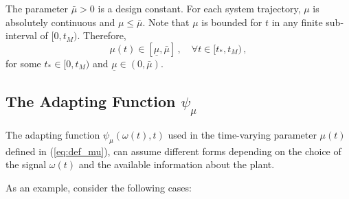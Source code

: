 \documentclass[letterpaper, 10 pt, conference]{ieeeconf}  %
\theoremstyle{plain}
\theoremstyle{definition}
\theoremstyle{remark}
\begin{document}
The parameter $\bar{\mu}\!>\!0$ is a design constant. For each
system trajectory, $\mu$ is absolutely continuous and
$\mu\!\leq\!\bar{\mu}$. Note that $\mu$ is bounded for $t$ in any
finite sub-interval of $[0,t_M)$. Therefore,
%
\begin{equation}
\mu(t)\in[\underline{\mu},\bar{\mu}]\,, \quad \forall
t\!\in\![t_*,t_M)\,, \label{eq:P3}
\end{equation}
%
for some $t_* \in [0,t_M)$ and
$\underline{\mu}\!\in\!(0,\bar{\mu})$. 




\subsection{The Adapting Function $\psi_\mu$}

The adapting function $\psi_\mu(\omega(t),t)$ used in the time-varying parameter $\mu(t)$ defined in (\ref{eq:def_mu}), can assume different forms depending on the choice of the signal $\omega(t)$ and the available information about the plant. 

As an example, consider the following cases:
%
\end{document}
